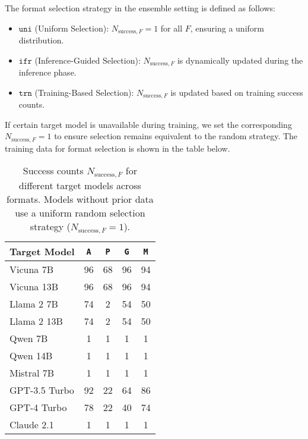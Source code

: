 The format selection strategy in the ensemble setting is defined as follows:

\begin{itemize}[wide]
\item  $\texttt{uni}$ (Uniform Selection): $N_{\text{success},F}=1$ for all $F$, ensuring a uniform distribution.

\item $\texttt{ifr}$ (Inference-Guided Selection): $N_{\text{success},F}$ is dynamically updated during the inference phase. 

\item  $\texttt{trn}$ (Training-Based Selection): $N_{\text{success},F}$ is updated based on training success counts. 
\end{itemize}

If certain target model is unavailable during training, we set the corresponding $N_{\text{success},F}=1$  to ensure selection remains equivalent to the random strategy. The training data for format selection is shown in the table below.


\begin{table}[h]
    \centering
    \begin{tabular}{lcccc}
        \toprule
        \textbf{Target Model} & \texttt{A} & \texttt{P} & \texttt{G} & \texttt{M} \\
        \midrule
        Vicuna 7B      & 96  & 68  & 96  & 94  \\
        Vicuna 13B     & 96  & 68  & 96  & 94  \\
        Llama 2 7B     & 74  & 2   & 54  & 50  \\
        Llama 2 13B    & 74  & 2   & 54  & 50  \\
        Qwen 7B        & 1   & 1   & 1   & 1   \\
        Qwen 14B       & 1   & 1   & 1   & 1   \\
        Mistral 7B     & 1   & 1   & 1   & 1   \\
        GPT-3.5 Turbo  & 92  & 22  & 64  & 86  \\
        GPT-4 Turbo    & 78  & 22  & 40  & 74  \\
        Claude 2.1     & 1   & 1   & 1   & 1   \\
        \bottomrule
    \end{tabular}
    \caption{Success counts $N_{\text{success},F}$ for different target models across formats. Models without prior data use a uniform random selection strategy ($N_{\text{success},F} = 1$).}
    \label{tab:format_selection}
\end{table}


